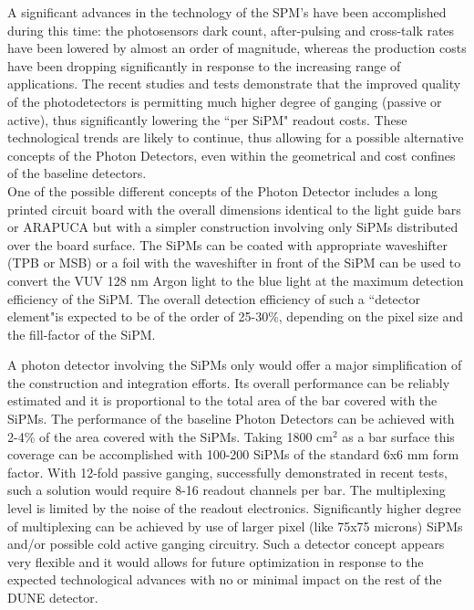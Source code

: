 A significant advances in the technology of the SPM's have been accomplished during this time: the photosensors dark count, after-pulsing and cross-talk rates have been lowered by almost an order of magnitude, whereas the production costs have been dropping significantly in response to the increasing range of applications.  The recent studies and tests demonstrate that the improved quality of the photodetectors is permitting much higher degree of ganging (passive or active), thus significantly lowering the ``per SiPM" readout costs.
These technological trends are likely to continue, thus allowing for a possible alternative concepts of the Photon Detectors, even within the geometrical and cost confines of the baseline detectors.\\
One of the possible different concepts of the Photon Detector includes a long printed circuit board with the overall dimensions identical to the light guide bars or ARAPUCA but with a simpler construction involving only SiPMs distributed over the board surface. The SiPMs can be coated with  appropriate waveshifter (TPB or MSB) or a foil with the waveshifter in front of the SiPM can be used to convert the VUV 128 nm Argon light to the blue light at the maximum detection efficiency of the SiPM. The overall detection efficiency of such a ``detector element"is expected to be of the order of 25-30\%, depending on the pixel size and the fill-factor of the SiPM.

A photon detector involving the SiPMs only would offer a major simplification of the construction and integration efforts. Its overall performance can be reliably estimated and it is proportional to the total area of the bar covered with the SiPMs.
The performance of the baseline Photon Detectors can be achieved with 2-4\% of the area covered with the SiPMs. Taking 1800 cm$^2$ as a bar surface this coverage can be accomplished with 100-200 SiPMs of the standard 6x6 mm form factor. With 12-fold passive ganging, successfully demonstrated in recent tests, such a solution would require 8-16 readout channels per bar. The multiplexing level is limited by the noise of the readout electronics. Significantly higher degree of multiplexing can be achieved by use of larger pixel (like 75x75 microns) SiPMs and/or possible cold active ganging circuitry. 
Such a detector concept appears very flexible and it would allows for future optimization in response to the expected technological advances with no or minimal impact on the rest of the DUNE  detector. 


